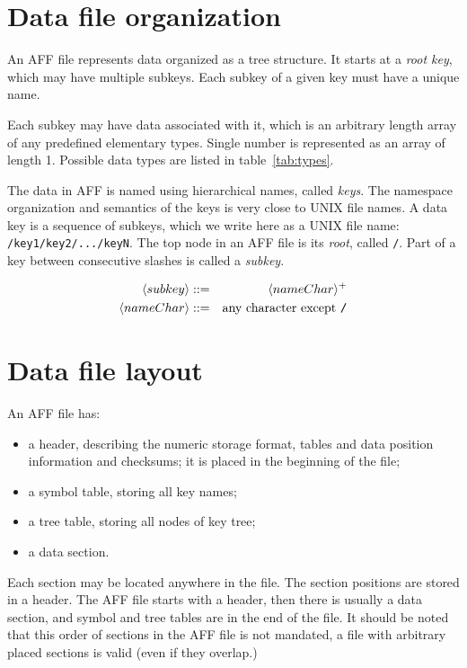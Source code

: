 \documentclass[10pt,letterpaper]{article}
\newcommand{\bi}{\begin{itemize}}
\newcommand{\ei}{\end{itemize}}             %
\newcommand{\term}[1]{\textit{#1}\index{\textit{#1}}}          %
\newcommand{\ctext}[1]{\texttt{#1}}         %
\begin{document}
\section{Data file organization}\label{file-org}
An AFF file represents data organized as a tree structure. 
It starts at a \term{root key}, which may have multiple subkeys. 
Each subkey of a given key must have a unique name. 

Each subkey may have data associated with it, which is an arbitrary length array of any
predefined elementary types.
Single number is represented as an array of length 1.
Possible data types are listed in table~\ref{tab:types}.

The data in AFF is named using hierarchical names, called
\term{keys}. The namespace organization and semantics of the keys is
very close to UNIX file names. A data key is a sequence of subkeys,
which we write here as a UNIX file name:
\ctext{/key1/key2/.../keyN}. The top node in an AFF file is its
\term{root}, called \ctext{/}. Part of a key between consecutive
slashes is called a \term{subkey}. 

\begin{eqnarray*}
\langle subkey \rangle & ::= & \langle nameChar \rangle ^{+} \\
\langle nameChar \rangle & ::= & \textrm{any character except  }  \verb|/|
\end{eqnarray*}

\section{Data file layout}
An AFF file has:
\bi
\item a header, describing the numeric storage format, tables and data
  position information and checksums; it is placed in the beginning of
  the file;
\item a symbol table, storing all key names;
\item a tree table, storing all nodes of key tree;
\item a data section.
\ei

Each section may be located anywhere in the file.  The section positions
are stored in a header.  The AFF file starts with a header, then there
is usually a data section, and symbol and tree tables are in the end
of the file. It should be noted that this order of sections in the AFF
file is not mandated, a file with arbitrary placed sections is valid
(even if they overlap.)
\end{document}
